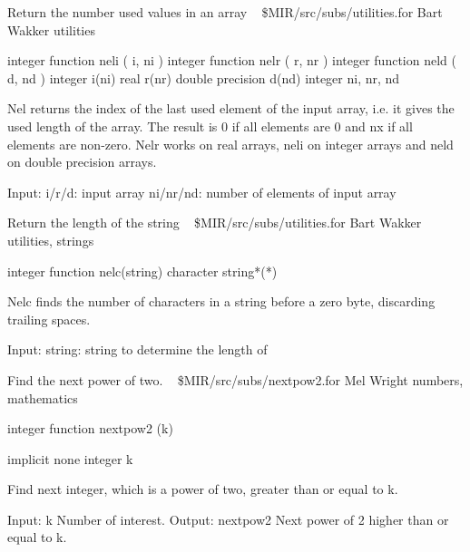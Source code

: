 %
\noindent Return the number used values in an array
\newline \ 
\newline {} \$MIR/src/subs/utilities.for
\newline {} Bart Wakker
\newline {} utilities
\par{\tenpoint
{\eightpoint\begintt
      integer          function neli ( i, ni )
      integer          function nelr ( r, nr )
      integer          function neld ( d, nd )
      integer          i(ni)
      real             r(nr)
      double precision d(nd)
      integer          ni, nr, nd

 Nel returns the index of the last used element of the input array, i.e. it
 gives the used length of the array. The result is 0 if all elements are 0 and
 nx if all elements are non-zero. Nelr works on real arrays, neli on integer
 arrays and neld on double precision arrays.

 Input:
   i/r/d:      input array
   ni/nr/nd:   number of elements of input array
\endtt}
\par}
%
\noindent Return the length of the string
\newline \ 
\newline {} \$MIR/src/subs/utilities.for
\newline {} Bart Wakker
\newline \abox{Keywords:} utilities, strings
\par{\tenpoint
{\eightpoint\begintt
      integer function nelc(string)
      character string*(*)

 Nelc finds the number of characters in a string before a zero byte, discarding
 trailing spaces.

 Input:
   string:   string to determine the length of
\endtt}
\par}
%
\noindent Find the next power of two.
\newline \ 
\newline {} \$MIR/src/subs/nextpow2.for
\newline \abox{Responsible:} Mel Wright
\newline {} numbers, mathematics
\par{\tenpoint
{\eightpoint\begintt
      integer function nextpow2 (k)

      implicit none
      integer k

  Find next integer, which is a power of two, greater than or equal to k.

  Input:
    k          Number of interest.
  Output:
    nextpow2   Next power of 2 higher than or equal to k.
\endtt}
\par}
